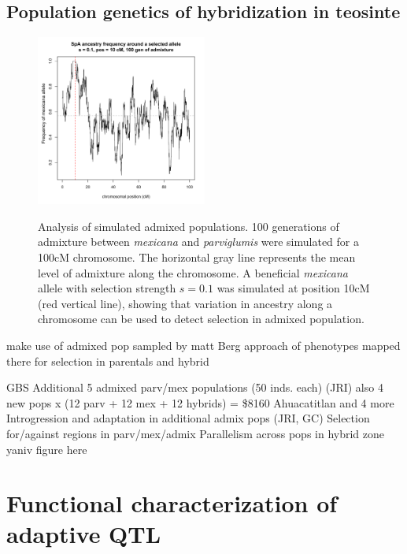 
\subsection{Population genetics of hybridization in teosinte} \label{subsec:admixpopgen}



\begin{figure}
  \centering
  \caption{Analysis of simulated admixed populations. 100 generations of admixture between \emph{mexicana} and \emph{parviglumis} were simulated for a 100cM chromosome.  The horizontal gray line represents the mean level of admixture along the chromosome.  A  beneficial \emph{mexicana} allele with selection strength $s=0.1$ was simulated at position 10cM (red vertical line), showing that variation in ancestry along a chromosome can be used to detect selection in admixed population. } 
   \includegraphics[width=0.5\textwidth]{admix.pdf}
\label{fig:cline}
\end{figure}

make use of admixed pop sampled by matt
Berg approach of phenotypes mapped there for selection in parentals and hybrid

GBS Additional 5 admixed parv/mex populations (50 inds. each) (JRI)
also 4 new pops x (12 parv + 12 mex + 12 hybrids) = \$8160
Ahuacatitlan and 4 more
Introgression and adaptation in additional admix pops (JRI, GC)
Selection for/against regions in parv/mex/admix
Parallelism across pops in hybrid zone
yaniv figure here

\section{Functional characterization of adaptive QTL} \label{sec:funchar}


